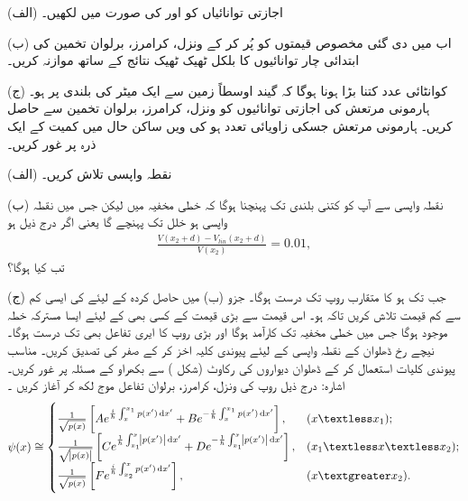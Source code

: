 (الف) اجازتی توانائیاں  کو  اور  کی صورت میں لکھیں۔

(ب) اب  میں دی گئی مخصوص قیمتوں کو پُر کر کے ونزل، کرامرز، برلوان تخمین کی ابتدائی چار توانائیوں کا بلکل ٹھیک ٹھیک نتائج کے ساتھ موازنہ کریں۔

(ج) کوانٹائی عدد  کتنا بڑا ہونا ہوگا کہ گیند اوسطاً زمین سے ایک میٹر کی بلندی پر ہو۔
ہارمونی مرتعش کی اجازتی توانائیوں کو ونزل، کرامرز، برلوان تخمین سے حاصل کریں۔
ہارمونی مرتعش جسکی زاویائی تعدد  ہو کی ویں ساکن حال میں کمیت  کے ایک ذرہ پر غور کریں۔

(الف) نقطہ واپسی  تلاش کریں۔

(ب) نقطہ واپسی سے آپ کو کتنی بلندی  تک پہنچنا ہوگا کہ خطی مخفیہ  میں لیکن جس میں نقطہ واپسی  ہو خلل  تک پہنچے گا یعنی اگر درج ذیل ہو
\begin{align*}
	\frac{V(x_{2}+d)-V_{lin}(x_{2}+d)}{V(x_{2})}=\num{0.01},
\end{align*}
تب  کیا ہوگا؟

(ج) جب تک  ہو  کا متقارب روپ  تک درست ہوگا۔ جزو (ب) میں حاصل کردہ  کے لیئے  کی ایسی کم سے کم قیمت تلاش کریں تاکہ  ہو۔ اس قیمت سے بڑی قیمت کے کسی بھی   کے لیئے ایسا مسترکہ خطہ موجود ہوگا جس میں خطی مخفیہ  تک کارآمد ہوگا اور بڑی  روپ کا ایری تفاعل بھی  تک درست ہوگا۔
نیچے رخ ڈھلوان کے نقطہ واپسی کے لیئے پیوندی کلیہ اخز کر کے  صفر کی تصدیق کریں۔
مناسب پیوندی کلیات استعمال کر کے ڈھلوان  دیواروں کی رکاوٹ (شکل ) سے بکھراو کے مسئلہ پر غور کریں۔ اشارہ: درج ذیل روپ کی ونزل، کرامرز، برلوان تفاعل موج لکھ کر آغاز کریں ۔
\begin{align}
	\psi(x)\cong
	\begin{cases}
		\frac{1}{\sqrt{p(x)}}\left[A e^{\frac{i}{\hslash}\int^{x_{1}}_{x}p(x')\dif x'}+B e^{-\frac{i}{\hslash}\int^{x_{1}}_{x}p(x')\dif x'}\right],& (x \textless x_{1}); \\
		\frac{1}{\sqrt{\abs{p(x)}}}\left[C e^{\frac{1}{\hslash}\int^{x}_{x_{1}}\abs{p(x')}\dif x'}+D e^{-\frac{1}{\hslash}\int^{x}_{x_{1}}\abs{p(x')}\dif x'}\right],& (x_{1} \textless x \textless x_{2}); \\
		\frac{1}{\sqrt{p(x)}}\left[F e^{\frac{i}{\hslash}\int^{x}_{x_{2}}p(x')\dif x'}\right],& (x \textgreater x_{2}).
	\end{cases}
\end{align}


